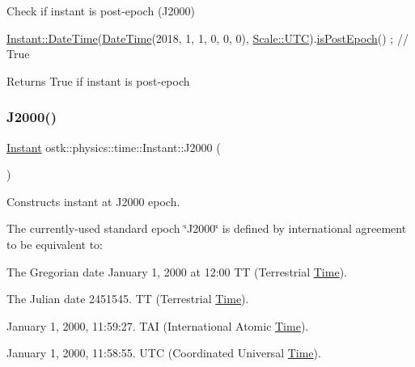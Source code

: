 Check if instant is post-\/epoch (J2000) 


\begin{DoxyCode}
\hyperlink{classostk_1_1physics_1_1time_1_1_instant_afd5725574a02389b80fad4baff313c8a}{Instant::DateTime}(\hyperlink{classostk_1_1physics_1_1time_1_1_instant_afd5725574a02389b80fad4baff313c8a}{DateTime}(2018, 1, 1, 0, 0, 0), 
      \hyperlink{namespaceostk_1_1physics_1_1time_adf23d37bd8641fb76a0e98ab46a70df7a9234324ddf6b4176b57d803a925b7961}{Scale::UTC}).\hyperlink{classostk_1_1physics_1_1time_1_1_instant_a2e7fcfd9e7aae17b737ee138098b9771}{isPostEpoch}() ; \textcolor{comment}{// True}
\end{DoxyCode}


\begin{DoxyReturn}{Returns}
True if instant is post-\/epoch 
\end{DoxyReturn}
\mbox{\label{classostk_1_1physics_1_1time_1_1_instant_a3f84d0c2d0b140326d3b172b54e3ffff}} 
\subsubsection{\texorpdfstring{J2000()}{J2000()}}
{\footnotesize\ttfamily \hyperlink{classostk_1_1physics_1_1time_1_1_instant}{Instant} ostk\+::physics\+::time\+::\+Instant\+::\+J2000 (\begin{DoxyParamCaption}{ }\end{DoxyParamCaption})\hspace{0.3cm}{\ttfamily [static]}}



Constructs instant at J2000 epoch. 

The currently-\/used standard epoch \char`\"{}\+J2000\char`\"{} is defined by international agreement to be equivalent to\+:
\begin{DoxyItemize}
\item The Gregorian date January 1, 2000 at 12\+:00 TT (Terrestrial \hyperlink{classostk_1_1physics_1_1time_1_1_time}{Time}).
\item The Julian date 2451545. TT (Terrestrial \hyperlink{classostk_1_1physics_1_1time_1_1_time}{Time}).
\item January 1, 2000, 11\+:59\+:27. T\+AI (International Atomic \hyperlink{classostk_1_1physics_1_1time_1_1_time}{Time}).
\item January 1, 2000, 11\+:58\+:55. U\+TC (Coordinated Universal \hyperlink{classostk_1_1physics_1_1time_1_1_time}{Time}).
\end{DoxyItemize}

